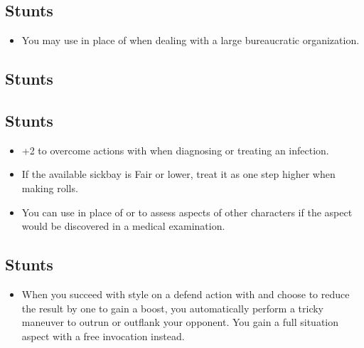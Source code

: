 \documentclass[12pt,titlepage,openany]{book}
\begin{document}
\subsection*{ Stunts}\label{subsec:bureaucracy-stunts}
\begin{itemize}
    \item {} You may use  in place of
         when dealing with a large bureaucratic organization.
\end{itemize}

\subsection*{ Stunts}\label{subsec:engineering-stunts}
\TBW

\subsection*{ Stunts}\label{subsec:medicine-stunts}
\begin{itemize}
    \item {} +2 to overcome actions with
         when diagnosing or treating an infection.

    \item {} If the available sickbay is Fair or lower, treat
        it as one step higher when making  rolls.

    \item {} You can use  in place of
         or  to assess aspects of other characters
        if the aspect would be discovered in a medical examination.
\end{itemize}

\subsection*{ Stunts}\label{subsec:pilot-stunts}
\begin{itemize}
    \item {} When you succeed with style on a defend action
        with  and choose to reduce the result by one to gain a
        boost, you automatically perform a tricky maneuver to outrun or
        outflank your opponent. You gain a full situation aspect with a free
        invocation instead.
\end{itemize}
\end{document}
